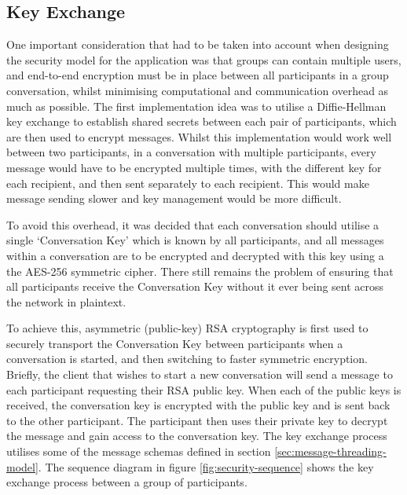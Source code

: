 \subsection{Key Exchange}
One important consideration that had to be taken into account when designing the security model for the application was that groups can contain multiple users, and end-to-end encryption must be in place between all participants in a group conversation, whilst minimising computational and communication overhead as much as possible. The first implementation idea was to utilise a Diffie-Hellman key exchange to establish shared secrets between each pair of participants, which are then used to encrypt messages. Whilst this implementation would work well between two participants, in a conversation with multiple participants, every message would have to be encrypted multiple times, with the different key for each recipient, and then sent separately to each recipient. This would make message sending slower and key management would be more difficult.

To avoid this overhead, it was decided that each conversation should utilise a single `Conversation Key' which is known by all participants, and all messages within a conversation are to be encrypted and decrypted with this key using a the AES-256 symmetric cipher. There still remains the problem of ensuring that all participants receive the Conversation Key without it ever being sent across the network in plaintext.

To achieve this, asymmetric (public-key) RSA cryptography is first used to securely transport the Conversation Key between participants when a conversation is started, and then switching to faster symmetric encryption. Briefly, the client that wishes to start a new conversation will send a message to each participant requesting their RSA public key. When each of the public keys is received, the conversation key is encrypted with the public key and is sent back to the other participant. The participant then uses their private key to decrypt the message and gain access to the conversation key. The key exchange process utilises some of the message schemas defined in section \ref{sec:message-threading-model}. The sequence diagram in figure \ref{fig:security-sequence} shows the key exchange process between a group of participants.

